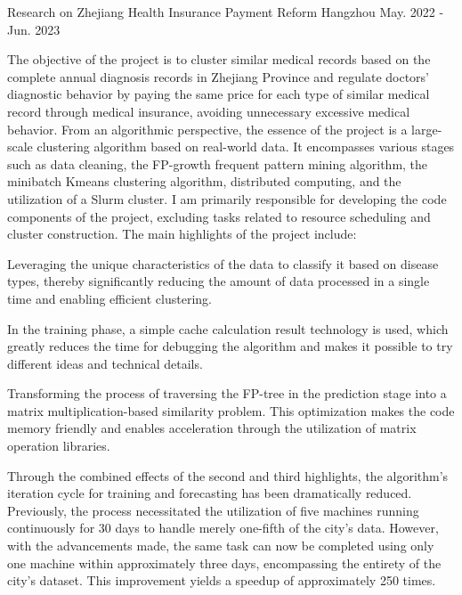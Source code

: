 \begin{cventries}
	\cventry
	{} %
	{Research on Zhejiang Health Insurance Payment Reform} %
	{Hangzhou} %
	{May. 2022 - Jun. 2023} %
	{
		The objective of the project is to cluster similar medical records based on the complete annual diagnosis records in Zhejiang Province and regulate doctors' diagnostic behavior by paying the same price for each type of similar medical record through medical insurance, avoiding unnecessary excessive medical behavior. \newline
		From an algorithmic perspective, the essence of the project is a large-scale clustering algorithm based on real-world data. It encompasses various stages such as data cleaning, the FP-growth frequent pattern mining algorithm, the minibatch Kmeans clustering algorithm, distributed computing, and the utilization of a Slurm cluster. I am primarily responsible for developing the code components of the project, excluding tasks related to resource scheduling and cluster construction. \newline
		The main highlights of the project include: \newline
		\vspace{3.5mm}
		\begin{cvitems} %
			\item{Leveraging the unique characteristics of the data to classify it based on disease types, thereby significantly reducing the amount of data processed in a single time and enabling efficient clustering.}
			\item{In the training phase, a simple cache calculation result technology is used, which greatly reduces the time for debugging the algorithm and makes it possible to try different ideas and technical details.}
			\item{Transforming the process of traversing the FP-tree in the prediction stage into a matrix multiplication-based similarity problem. This optimization makes the code memory friendly and enables acceleration through the utilization of matrix operation libraries.}
			\item {Through the combined effects of the second and third highlights, the algorithm's iteration cycle for training and forecasting has been dramatically reduced. Previously, the process necessitated the utilization of five machines running continuously for 30 days to handle merely one-fifth of the city's data. However, with the advancements made, the same task can now be completed using only one machine within approximately three days, encompassing the entirety of the city's dataset. This improvement yields a speedup of approximately 250 times.}
		\end{cvitems}
	}

\end{cventries}
